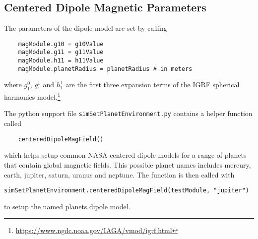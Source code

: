 \subsection{Centered Dipole Magnetic Parameters}
The parameters of the dipole model are set by calling
\begin{verbatim}
    magModule.g10 = g10Value
    magModule.g11 = g11Value
    magModule.h11 = h11Value
    magModule.planetRadius = planetRadius # in meters
\end{verbatim}
where $g_{1}^{0}$, $g_{1}^{1}$ and $h_{1}^{1}$ are the first three expansion terms of the IGRF spherical harmonics model.\footnote{\url{https://www.ngdc.noaa.gov/IAGA/vmod/igrf.html}}

The python support file {\tt simSetPlanetEnvironment.py} contains a helper function called 
\begin{verbatim}
	centeredDipoleMagField()
\end{verbatim} 
which helps setup common NASA centered dipole models for a range of planets that contain global magnetic fields.  This possible planet names includes mercury, earth, jupiter, saturn, uranus and neptune.  The function is then called with
\begin{verbatim}
simSetPlanetEnvironment.centeredDipoleMagField(testModule, "jupiter")
\end{verbatim}
to setup the named planets dipole model.

